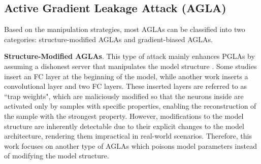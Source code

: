 \subsection{Active Gradient Leakage Attack (AGLA)}
Based on the manipulation strategies, most AGLAs can be classified into two categories: structure-modified AGLAs and gradient-biased AGLAs.

\textbf{Structure-Modified AGLAs}.
This type of attack mainly enhances PGLAs by assuming a dishonest server that manipulates the model structure \cite{boenisch2023curious, fowl2021robbing, nowak2024qbi, zhao2023loki}. Some studies \cite{fowl2021robbing, nowak2024qbi} insert an FC layer at the beginning of the model, while another work \cite{zhao2023loki} inserts a convolutional layer and two FC layers. These inserted layers are referred to as ``trap weights", which are maliciously modified so that the neurons inside are activated only by samples with specific properties, enabling the reconstruction of the sample with the strongest property. However, modifications to the model structure are inherently detectable due to their explicit changes to the model architecture, rendering them impractical in real-world scenarios. Therefore, this work focuses on another type of AGLAs \cite{zhang2022compromise, wen2022fishing, Garov2024Hiding} which poisons model parameters instead of modifying the model structure. 

